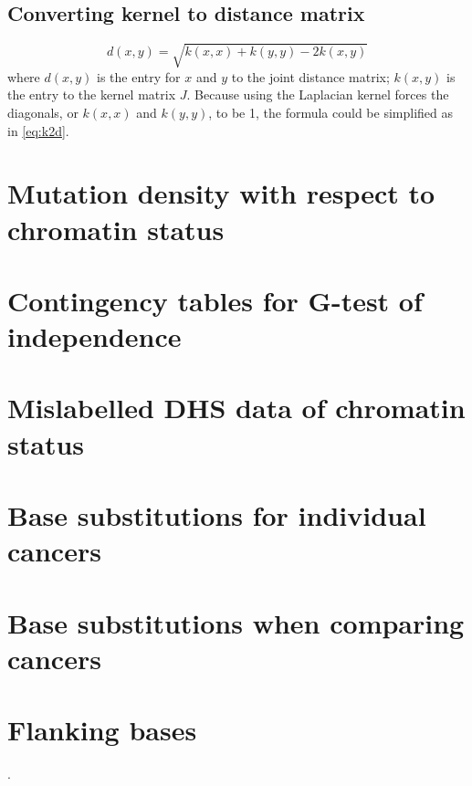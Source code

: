 \subsection{Converting kernel to distance matrix}

\begin{equation}
    d(x,y) = \sqrt{k(x,x) + k(y,y) - 2k(x,y)} 
    \label{eq:k2d_ori}
\end{equation}
where $d(x,y)$ is the entry for $x$ and $y$ to the joint distance matrix; $k(x,y)$ is the entry to the kernel matrix $J$. Because using the Laplacian kernel forces the diagonals, or $k(x,x)$ and $k(y,y)$, to be 1, the formula could be simplified as in \ref{eq:k2d}.

\newpage
\section{Mutation density with respect to chromatin status}



\newpage
\section{Contingency tables for G-test of independence}\label{apdx:g-test}



\newpage
\section{Mislabelled DHS data of chromatin status}


\newpage
\section{Base substitutions for individual cancers}


\newpage
\section{Base substitutions when comparing cancers}


\newpage
\section{Flanking bases}

.

\newpage
